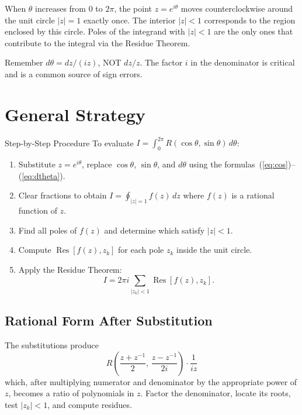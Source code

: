 \documentclass[12pt,a4paper]{article}
\begin{document}
When $\theta$ increases from $0$ to $2\pi$, the point $z = e^{i\theta}$ moves
counterclockwise around the unit circle $|z| = 1$ exactly once. The interior
$|z| < 1$ corresponds to the region enclosed by this circle. Poles of the
integrand with $|z| < 1$ are the only ones that contribute to the integral via
the Residue Theorem.

\begin{learnbox}{Remember}
$d\theta = dz/(iz)$, NOT $dz/z$. The factor $i$ in the denominator is critical
and is a common source of sign errors.
\end{learnbox}

\section{General Strategy}

\begin{infobox}{Step-by-Step Procedure}
To evaluate $\displaystyle I = \int_0^{2\pi} R(\cos\theta,\sin\theta)\,d\theta$:
\begin{enumerate}
  \item Substitute $z = e^{i\theta}$, replace $\cos\theta$, $\sin\theta$, and
        $d\theta$ using the formulas~(\ref{eq:cos})--(\ref{eq:dtheta}).
  \item Clear fractions to obtain $I = \oint_{|z|=1} f(z)\,dz$ where $f(z)$ is
        a rational function of $z$.
  \item Find all poles of $f(z)$ and determine which satisfy $|z| < 1$.
  \item Compute $\operatorname{Res}[f(z), z_k]$ for each pole $z_k$ inside the
        unit circle.
  \item Apply the Residue Theorem:
        \[
          I = 2\pi i \sum_{|z_k|<1} \operatorname{Res}[f(z), z_k].
        \]
\end{enumerate}
\end{infobox}

\subsection*{Rational Form After Substitution}

The substitutions produce
\[
  R\!\left(\frac{z+z^{-1}}{2},\, \frac{z-z^{-1}}{2i}\right) \cdot \frac{1}{iz}
\]
which, after multiplying numerator and denominator by the appropriate power of
$z$, becomes a ratio of polynomials in $z$. Factor the denominator, locate its
roots, test $|z_k| < 1$, and compute residues.
\end{document}
